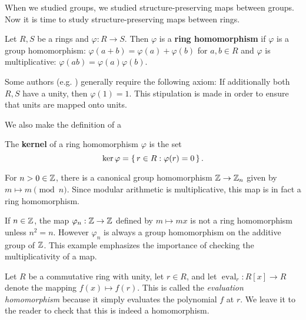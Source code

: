 \documentclass[./main.tex]{subfiles}
\begin{document}
When we studied groups, we studied structure-preserving maps between groups. Now
it is time to study structure-preserving maps between rings. 

\begin{definition}
\label{def:ring-homomorphisms}
Let $R, S$ be a rings and $\varphi: R \to S$. Then $\varphi$ is a \textbf{ring
homomorphism} if $\varphi$ is a group homomorphism: $\varphi(a+b) = \varphi(a) +
\varphi(b)$ for $a,b \in R$ and $\varphi$ is multiplicative: $\varphi(ab) =
\varphi(a) \varphi(b)$.
\end{definition}

Some authors (e.g. \cite{Jacobson_2009}) generally require the following axiom:
If additionally both $R, S$ have a unity, then $\varphi(1) = 1$. This
stipulation is made in order to ensure that units are mapped onto units. 

We also make the definition of a 
\begin{definition}[Kernel]
\label{def:ring-homomorphism-kernel}
The \textbf{kernel} of a ring homomorphism $\varphi$ is the set 
\[
    \ker \varphi = \set{r \in R: \varphi(r) = 0}.
\]
\end{definition}


\begin{example}
    For $n > 0 \in \mathbb{Z}$, there is a canonical group homomorphism $\mathbb{Z} \to \mathbb{Z}_n$
    given by $m \mapsto m \pmod n$. Since modular arithmetic is multiplicative,
    this map is in fact a ring homomorphism. 
\end{example}

\begin{example}
    If $n \in \mathbb{Z}$, the map $\varphi_n: \mathbb{Z} \to \mathbb{Z}$ defined by $m \mapsto mx$
    is not a ring homomorphism unless $n^2 = n$. However $\varphi_n$ is always a
    group homomorphism on the additive group of $\mathbb{Z}$. This example emphasizes
    the importance of checking the multiplicativity of a map.
\end{example}

\begin{example}
    Let $R$ be a commutative ring with unity, let $r \in R$, and let
    $\operatorname{eval}_r: R[x] \to R$ denote the mapping $f(x) \mapsto f(r)$.
    This is called the \emph{evaluation homomorphism} because it simply
    evaluates the polynomial $f$ at $r$. We leave it to the reader to check that
    this is indeed a homomorphism. 
\end{example}
\end{document}
